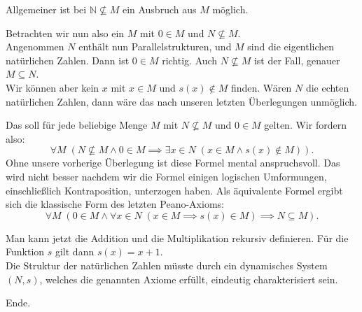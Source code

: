 \documentclass[9pt]{beamer}
\newcommand{\N}{\mathbb N}
\begin{document}
\begin{frame}
Allgemeiner ist bei $\N\not\subseteq M$ ein Ausbruch aus $M$ möglich.
\end{frame}

\begin{frame}
Betrachten wir nun also ein $M$ mit $0\in M$ und $N\not\subseteq M$.\\[1em]

Angenommen $N$ enthält nun Parallelstrukturen, und $M$ sind die
eigentlichen natürlichen Zahlen. Dann ist $0\in M$ richtig. Auch
$N\not\subseteq M$ ist der Fall, genauer $M\subseteq N$.\\[1em]

Wir können aber kein $x$ mit $x\in M$ und $s(x)\notin M$ finden.
Wären $N$ die echten natürlichen Zahlen, dann wäre das nach
unseren letzten Überlegungen unmöglich.
\end{frame}

\begin{frame}
Das soll für jede beliebige Menge $M$ mit $N\not\subseteq M$ und
$0\in M$ gelten. Wir fordern also:
\[\forall M\; (N\not\subseteq M\land 0\in M\implies
\exists x{\in}N\;(x\in M\land s(x)\notin M)).\]
Ohne unsere vorherige Überlegung ist diese Formel mental anspruchsvoll.
Das wird nicht besser nachdem wir die Formel einigen logischen
Umformungen, einschließlich Kontraposition, unterzogen haben. Als
äquivalente Formel ergibt sich die klassische Form des letzten Peano-Axioms:
\[\forall M\; (0\in M\land
\forall x{\in}N\;(x\in M\implies s(x)\in M)\implies N\subseteq M).\]
\end{frame}

\begin{frame}
Man kann jetzt die Addition und die Multiplikation rekursiv
definieren. Für die Funktion $s$ gilt dann $s(x)=x+1$.\\[1em]

Die Struktur der natürlichen Zahlen müsste durch ein dynamisches System
$(N,s)$, welches die genannten Axiome erfüllt,
eindeutig charakterisiert sein.\\[1em]
\end{frame}

\begin{frame}
Ende.
\end{frame}
\end{document}
